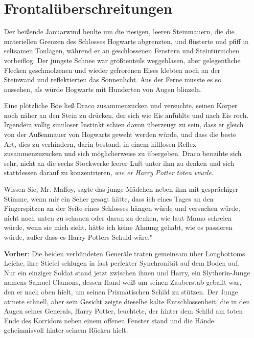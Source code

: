 \chapter{Frontalüberschreitungen}

Der beißende Januarwind heulte um die riesigen, leeren Steinmauern, die die
materiellen Grenzen des Schlosses Hogwarts abgrenzten, und flüsterte und pfiff
in seltsamen Tonlagen, während er an geschlossenen Fenstern und Steintürmchen
vorbeiflog. Der jüngste Schnee war größtenteils weggeblasen, aber gelegentliche
Flecken geschmolzenen und wieder gefrorenen Eises klebten noch an der Steinwand
und reflektierten das Sonnenlicht. Aus der Ferne musste es so aussehen, als
würde Hogwarts mit Hunderten von Augen blinzeln.

Eine plötzliche Böe ließ Draco zusammenzucken und versuchte, seinen Körper noch
näher an den Stein zu drücken, der sich wie Eis anfühlte und nach Eis roch.
Irgendein völlig sinnloser Instinkt schien davon überzeugt zu sein, dass er
gleich von der Außenmauer von Hogwarts geweht werden würde, und dass die beste
Art, dies zu verhindern, darin bestand, in einem hilflosen Reflex
zusammenzuzucken und sich möglicherweise zu übergeben. Draco bemühte sich sehr,
nicht an die sechs Stockwerke leerer Luft unter ihm zu denken und sich
stattdessen darauf zu konzentrieren, \emph{wie er Harry Potter töten würde.}

\glqq Wissen Sie, Mr. Malfoy\grqq{}, sagte das junge Mädchen neben ihm mit
gesprächiger Stimme, \glqq wenn mir ein Seher gesagt hätte, dass ich eines Tages
an den Fingerspitzen an der Seite eines Schlosses hängen würde und versuchen
würde, nicht nach unten zu schauen oder daran zu denken, wie laut Mama schreien
würde, wenn sie mich sieht, hätte ich keine Ahnung gehabt, wie es passieren
würde, außer dass es Harry Potters Schuld wäre."

\textbf{Vorher}: Die beiden verbündeten Generäle traten gemeinsam über
Longbottoms Leiche, ihre Stiefel schlugen in fast perfekter Synchronität auf dem
Boden auf. Nur ein einziger Soldat stand jetzt zwischen ihnen und Harry, ein
Slytherin-Junge namens Samuel Clamons, dessen Hand weiß um seinen Zauberstab
geballt war, den er nach oben hielt, um seinen Prismatischen Schild zu stützen.
Der Junge atmete schnell, aber sein Gesicht zeigte dieselbe kalte
Entschlossenheit, die in den Augen seines Generals, Harry Potter, leuchtete, der
hinter dem Schild am toten Ende des Korridors neben einem offenen Fenster stand
und die Hände geheimnisvoll hinter seinem Rücken hielt.

